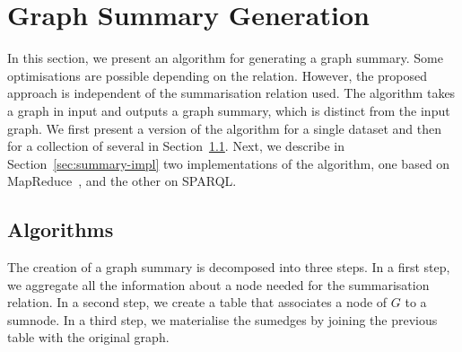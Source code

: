 \section{Graph Summary Generation}
\label{chap:summary:algo}

In this section, we present an algorithm for generating a graph summary. Some optimisations are possible depending on the relation. However, the proposed approach is independent of the summarisation relation used. The algorithm takes a graph in input and outputs a graph summary, which is distinct from the input graph.
We first present a version of the algorithm for a single dataset and then for a collection of several in Section~\ref{sec:summary-algos}.
Next, we describe in Section~\ref{sec:summary-impl} two implementations of the algorithm, one based on MapReduce~\cite{dean:2004:msd}, and the other on SPARQL.

\subsection{Algorithms}
\label{sec:summary-algos}

The creation of a graph summary is decomposed into three steps. In a first step, we aggregate all the information about a node needed for the summarisation relation. In a second step, we create a table that associates a node of $G$ to a sumnode. In a third step, we materialise the sumedges by joining the previous table with the original graph.

